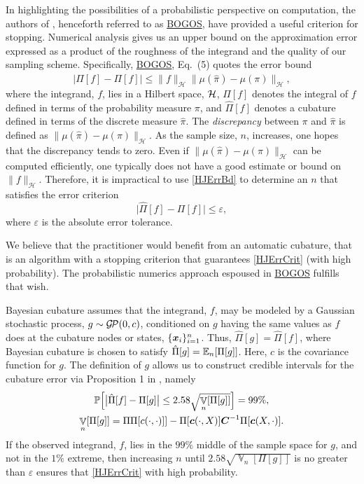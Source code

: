 \documentclass[sts]{imsart}
\numberwithin{equation}{section}
\theoremstyle{plain}
\newcommand{\calH}{\mathcal{H}}
\newcommand{\vC}{\boldsymbol{C}}
\newcommand{\calGP}{\cg\!\cp}
\DeclareMathOperator{\Var}{\mathbb{V}}
\newcommand{\BOGOS}{\hyperlink{BriEtal18a}{BOGOS}\xspace}
\begin{document}
In highlighting the possibilities of a probabilistic perspective on computation, the authors of \cite{BriEtal18a}, henceforth referred to as \BOGOS, have provided a useful criterion for stopping.  Numerical analysis gives us an upper bound on the approximation error expressed as a product of the roughness of the integrand and the quality of our sampling scheme.  Specifically, \BOGOS, Eq.\ (5) quotes the error bound
\begin{equation} \label{HJErrBd}
    \bigl \lvert \hat{\Pi}[f] - \Pi[f] \rvert \le \lVert f \rVert_{\calH} \lVert \mu(\hat{\pi}) - \mu(\pi) \rVert_{\calH},
\end{equation}
where the integrand, $f$, lies in a Hilbert space, $\mathcal{H}$, $\Pi[f]$ denotes the integral of $f$ defined in terms of the probability measure $\pi$, and $\hat{\Pi}[f]$ denotes a cubature defined in terms of the discrete measure $\hat{\pi}$. The \emph{discrepancy} between $\pi$ and $\hat{\pi}$ is defined as $\lVert \mu(\hat{\pi}) - \mu(\pi) \rVert_{\calH}$. As the sample size, $n$, increases, one hopes that the discrepancy tends to zero.  Even if $\lVert \mu(\hat{\pi}) - \mu(\pi) \rVert_{\calH}$ can be computed efficiently, one typically does not have a good estimate or bound on $\lVert f \rVert_{\calH}$.  Therefore, it is impractical to use  \eqref{HJErrBd} to determine an $n$ that satisfies the error criterion
\begin{equation} \label{HJErrCrit}
    \bigl \lvert \hat{\Pi}[f] - \Pi[f] \bigr \rvert \le \varepsilon,
\end{equation}
where $\varepsilon$ is the absolute error tolerance.  

We believe that the practitioner would benefit from an automatic cubature, that is an algorithm with a stopping criterion that guarantees \eqref{HJErrCrit} (with high probability).  The probabilistic numerics approach espoused in \BOGOS fulfills that wish.  

Bayesian cubature assumes that the integrand, $f$, may be modeled by a Gaussian stochastic process, $g \sim \calGP(0,c)$, conditioned on $g$ having the same values as $f$ does at the cubature nodes or states, $\{\boldsymbol{x}_i\}_{i=1}^n$.  Thus, $\hat{\Pi}[g] = \hat{\Pi}[f]$, where Bayesian cubature is chosen to satisfy $\hat{\Pi}[g] = \operatorname{\mathbb{E}}_n[\Pi[g]]$.  Here, $c$ is the covariance function for $g$.  The definition of $g$ allows us to construct credible intervals for the cubature error via Proposition 1 in  \cite{BriEtal18a}, namely
\begin{gather}
\label{credInt}
    \Prob\Bigl[\bigl \lvert \hat{\Pi}[f] - \Pi[g] \bigr \rvert \le 2.58 \sqrt{\Var_n[\Pi[g]]}  \Bigr] = 99\%, \\
    \label{Vnform}
    \Var_n[\Pi[g]] = \Pi\Pi[c(\cdot,\cdot)]] - \Pi[\vc(\cdot,X)] \vC^{-1} \Pi[\vc(X,\cdot)].
\end{gather}
If the observed integrand, $f$, lies in the $99\%$ middle of the sample space for $g$, and not in the $1\%$ extreme, then increasing $n$ until $2.58 \sqrt{\Var_n[\Pi[g]]}$ is no greater than $\varepsilon$ ensures that  \eqref{HJErrCrit} with high probability.
\end{document}
